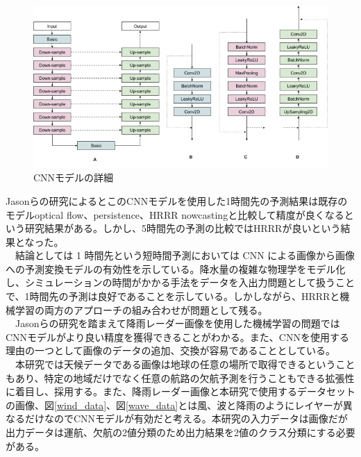 \begin{figure}[H]
 \centering
 \includegraphics[keepaspectratio, scale=0.4]{fig/chapter1/rainfull_model.png}
 \caption{CNNモデルの詳細\cite{rainfull}}
 \label{rainfull_m}
\end{figure}
Jasonらの研究によるとこのCNNモデルを使用した1時間先の予測結果は既存のモデルoptical flow\cite{optical-flow}、persistence\cite{persistence}、HRRR nowcasting\cite{HRRR}と比較して精度が良くなるという研究結果がある。しかし、5時間先の予測の比較ではHRRRが良いという結果となった。\\
　結論としては 1 時間先という短時間予測においては CNN による画像から画像への予測変換モデルの有効性を示している。降水量の複雑な物理学をモデル化し、シミュレーションの時間がかかる手法をデータを入出力問題として扱うことで、1時間先の予測は良好であることを示している。しかしながら、HRRRと機械学習の両方のアプローチの組み合わせが問題として残る。\\
　Jasonらの研究を踏まえて降雨レーダー画像を使用した機械学習の問題ではCNNモデルがより良い精度を獲得できることがわかる。また、CNNを使用する理由の一つとして画像のデータの追加、交換が容易であることとしている。\\
　本研究では天候データである画像は地球の任意の場所で取得できるということもあり、特定の地域だけでなく任意の航路の欠航予測を行うこともできる拡張性に着目し、採用する。また、降雨レーダー画像と本研究で使用するデータセットの画像、図\ref{wind_data}、図\ref{wave_data}とは風、波と降雨のようにレイヤーが異なるだけなのでCNNモデルが有効だと考える。本研究の入力データは画像だが出力データは運航、欠航の2値分類のため出力結果を2値のクラス分類にする必要がある。


